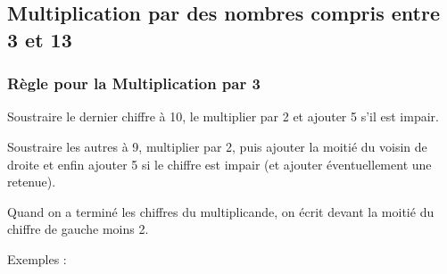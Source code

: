 \documentclass[a4paper, twoside]{article}
\begin{document}
		\newpage

		\subsection{Multiplication par des nombres compris entre 3 et 13}

		\subsubsection*{Règle pour la Multiplication par 3}

		Soustraire le dernier chiffre à 10, le multiplier par 2 et ajouter 5 s'il est impair.

		Soustraire les autres à 9, multiplier par 2, puis ajouter la moitié du voisin de droite et enfin ajouter 5 si le chiffre est impair (et ajouter éventuellement une retenue).

		Quand on a terminé les chiffres du multiplicande, on écrit devant la moitié du chiffre de gauche moins 2.\\

		\vspace{-2 mm}

		{ \parindent=0.5cm Exemples : }
\end{document}
